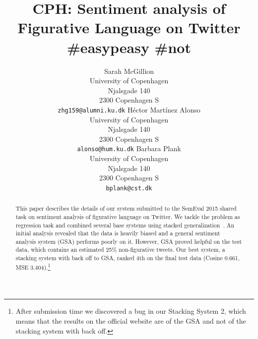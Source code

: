 \documentclass[11pt,letterpaper]{article}
\title{CPH: Sentiment analysis of Figurative Language on Twitter \#easypeasy \#not}
\author{Sarah McGillion\\
		University of Copenhagen\\
  	Njalsgade 140 \\
  	2300 Copenhagen S\\
		    {\tt  zhg159@alumni.ku.dk}  
	    	 \And
	H\'{e}ctor Mart\'{i}nez Alonso\\
  	University of Copenhagen\\
  	Njalsgade 140 \\
  	2300 Copenhagen S\\
	  {\tt alonso@hum.ku.dk}
		\And
		Barbara Plank\\
  	University of Copenhagen\\
  	Njalsgade 140 \\
  	2300 Copenhagen S\\
  {\tt bplank@cst.dk}
}
\date{}
\begin{document}
\maketitle
\begin{abstract}
 This paper describes the details of our system submitted to the SemEval 2015 shared task on sentiment analysis of figurative language on Twitter. We tackle the problem as regression task and combined several base systems using stacked generalization~\cite{Wolpert:1992}. An initial analysis revealed that the data is heavily biased and a general sentiment analysis system (GSA) performs poorly on it. However, GSA proved helpful on the test data, which contains an estimated 25\% non-figurative tweets. Our best system, a stacking system with back off to GSA, ranked 4th on the final test data (Cosine 0.661, MSE 3.404).\footnote{After submission time we discovered a bug in our Stacking System 2, which means that the results on the official website are of the GSA and not of the stacking system with back off. } %
 
\end{abstract}
\end{document}
